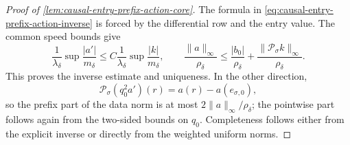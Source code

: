 \begin{proof}[Proof of \cref{lem:causal-entry-prefix-action-core}]
The formula in \cref{eq:causal-entry-prefix-action-inverse} is forced by
the differential row and the entry value.  The common speed bounds give
\[
 \frac1{\lambda_\delta}
 \sup\frac{|a'|}{m_\delta}
 \le C\frac1{\lambda_\delta}
 \sup\frac{|k|}{m_\delta},
 \qquad
 \frac{\|a\|_\infty}{\rho_\delta}
 \le\frac{|b_0|}{\rho_\delta}
   +\frac{\|\mathcal P_\sigma k\|_\infty}{\rho_\delta}.
\]
This proves the inverse estimate and uniqueness.  In the other direction,
\begin{equation*}
 \mathcal P_\sigma(q_0^2a')(r)=a(r)-a(e_{\sigma,0}),
\end{equation*}
so the prefix part of the data norm is at most
\(2\|a\|_\infty/\rho_\delta\); the pointwise part follows again from
the two-sided bounds on \(q_0\).  Completeness follows either from the
explicit inverse or directly from the weighted uniform norms.
\end{proof}

